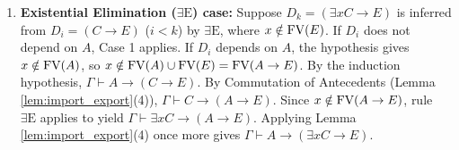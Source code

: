 \documentclass[10pt,a4paper]{article}
\begin{document}
\begin{enumerate}
\item \textbf{Existential Elimination ($\exists\textrm{E}$) case:} Suppose $D_k = (\exists x C \to E)$ is inferred from $D_i = (C \to E)$ ($i < k$) by $\exists\textrm{E}$, where $x \notin {\textrm{FV}}(E)$. If $D_i$ does not depend on $A$, Case 1 applies. If $D_i$ depends on $A$, the hypothesis gives $x \notin {\textrm{FV}}(A)$, so $x \notin {\textrm{FV}}(A) \cup {\textrm{FV}}(E) = {\textrm{FV}}(A \to E)$. By the induction hypothesis, $\Gamma \vdash A \to (C \to E)$. By Commutation of Antecedents (Lemma \ref{lem:import_export}(4)), $\Gamma \vdash C \to (A \to E)$. Since $x \notin {\textrm{FV}}(A \to E)$, rule $\exists\textrm{E}$ applies to yield $\Gamma \vdash \exists x C \to (A \to E)$. Applying Lemma \ref{lem:import_export}(4) once more gives $\Gamma \vdash A \to (\exists x C \to E)$.
\end{enumerate}
\myqed
\end{document}
